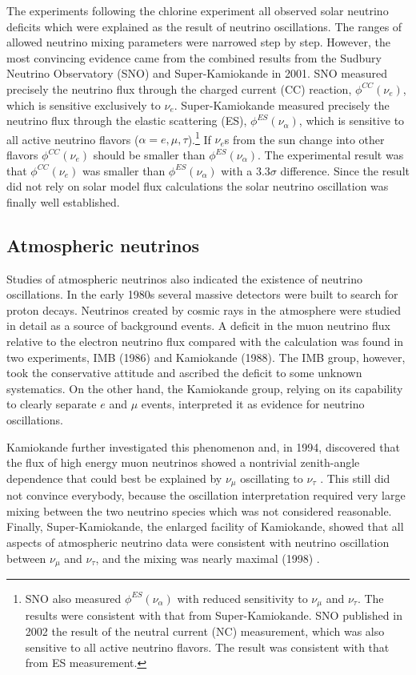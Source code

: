 The experiments \cite{Hir89, Aba91, Ans92} following the chlorine
experiment all observed solar neutrino deficits which were explained
as the result of neutrino oscillations. The ranges of allowed neutrino
mixing parameters were narrowed step by step. However, the most
convincing evidence came from the combined results from the Sudbury
Neutrino Observatory (SNO) \cite{Ahm01} and Super-Kamiokande
\cite{Fuk01} in 2001. SNO measured precisely the neutrino flux through
the charged current (CC) reaction, $\phi^{CC}(\nu_e)$, which is
sensitive exclusively to $\nu_e$. Super-Kamiokande measured precisely
the neutrino flux through the elastic scattering (ES),
$\phi^{ES}(\nu_\alpha)$, which is sensitive to all active neutrino
flavors ($\alpha = e, \mu, \tau$).\footnote{SNO also measured
$\phi^{ES}(\nu_\alpha)$ with reduced sensitivity to $\nu_{\mu}$ and
$\nu_{\tau}$. The results were consistent with that from
Super-Kamiokande. SNO published in 2002 the result of the neutral
current (NC) measurement, which was also sensitive to all active
neutrino flavors. The result was consistent with that from ES
measurement.} If $\nu_e$s from the sun change into other flavors
$\phi^{CC}(\nu_e)$ should be smaller than $\phi^{ES}(\nu_\alpha)$. The
experimental result was that $\phi^{CC}(\nu_e)$ was smaller than
$\phi^{ES}(\nu_\alpha)$ with a $3.3\sigma$ difference. Since the
result did not rely on solar model flux calculations the solar
neutrino oscillation was finally well established.


\subsection{Atmospheric neutrinos}
\label{sec:atmo}
Studies of atmospheric neutrinos also indicated the existence of
neutrino oscillations. In the early 1980s several massive detectors
were built to search for proton decays. Neutrinos created by cosmic
rays in the atmosphere were studied in detail as a source of
background events. A deficit in the muon neutrino flux relative to the
electron neutrino flux compared with the calculation was found in two
experiments, IMB \cite{Hai86} (1986) and Kamiokande \cite{Hir88}
(1988). The IMB group, however, took the conservative attitude and
ascribed the deficit to some unknown systematics. On the other hand,
the Kamiokande group, relying on its capability to clearly separate
$e$ and $\mu$ events, interpreted it as evidence for neutrino
oscillations.

Kamiokande further investigated this phenomenon and, in 1994,
discovered that the flux of high energy muon neutrinos showed a
nontrivial zenith-angle dependence that could best be explained by
$\nu_\mu$ oscillating to $\nu_\tau$ \cite{Fuk94}. This still did not
convince everybody, because the oscillation interpretation required
very large mixing between the two neutrino species which was not
considered reasonable. Finally, Super-Kamiokande, the enlarged
facility of Kamiokande, showed that all aspects of atmospheric
neutrino data were consistent with neutrino oscillation between
$\nu_\mu$ and $\nu_\tau$, and the mixing was nearly maximal (1998)
\cite{Fuk98}.

